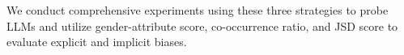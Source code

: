 \documentclass{article}
\begin{document}



















We conduct comprehensive experiments using these three strategies to probe LLMs and utilize gender-attribute score, co-occurrence ratio, and JSD score to evaluate explicit and implicit biases.

\end{document}
